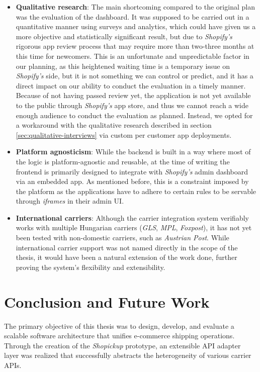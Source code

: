 \documentclass{imc-inf}
\begin{document}
\begin{itemize}[itemsep=3pt]
  \item \textbf{Qualitative research}: The main shortcoming compared to the original plan was the evaluation of the dashboard.
        It was supposed to be carried out in a quantitative manner using surveys and analytics, which could have given us a more objective and statistically significant result, but due to \textit{Shopify's} rigorous app review process that may require more than two-three months at this time for newcomers.
        This is an unfortunate and unpredictable factor in our planning, as this heightened waiting time is a temporary issue on \textit{Shopify's} side, but it is not something we can control or predict, and it has a direct impact on our ability to conduct the evaluation in a timely manner.
        Because of not having passed review yet, the application is not yet available to the public through \textit{Shopify's} app store, and thus we cannot reach a wide enough audience to conduct the evaluation as planned.
        Instead, we opted for a workaround with the qualitative research described in section \ref{sec:qualitative-interviews} via custom per customer app deployments.
  \item \textbf{Platform agnosticism}: While the backend is built in a way where most of the logic is platform-agnostic and reusable, at the time of writing the frontend is primarily designed to integrate with \textit{Shopify's} admin dashboard via an embedded app. As mentioned before, this is a constraint imposed by the platform as the applications have to adhere to certain rules to be servable through \textit{iframes} in their admin UI.
  \item \textbf{International carriers}: Although the carrier integration system verifiably works with multiple Hungarian carriers (\textit{GLS}, \textit{MPL}, \textit{Foxpost}), it has not yet been tested with non-domestic carriers, such as \textit{Austrian Post}. While international carrier support was not named directly in the scope of the thesis, it would have been a natural extension of the work done, further proving the system's flexibility and extensibility.
\end{itemize}


\chapter{Conclusion and Future Work}
\label{ch:conclusion}
The primary objective of this thesis was to design, develop, and evaluate a scalable software architecture that unifies e-commerce shipping operations.
Through the creation of the \textit{Shopickup} prototype, an extensible API adapter layer was realized that successfully abstracts the heterogeneity of various carrier APIs.
\end{document}
